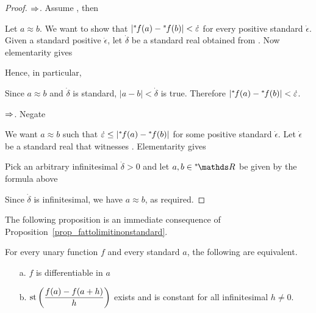 \begin{proof}
  $\Rightarrow$.
  Assume , then


  Let $a\approx b$.
  We want to show that $|{}^*\kern-.2ex f(a)-{}^*\kern-.2ex f(b)|<\dot{\varepsilon}$ for every positive standard $\dot\epsilon$.
  Given a standard positive $\dot\epsilon$, let $\dot\delta$ be a standard real obtained from .
  Now elementarity gives


  Hence, in particular,

  \ceq{\hfill\ns\RR}{\models}{\phantom{\A\,\epsilon>0\ \E\,\delta>0\ \A x, y\ \Big[}|a-b|<\dot\delta\ \ \imp\ \ |fa-fb|<\dot\epsilon.}

  Since $a\approx b$ and $\dot\delta$ is standard, $|a-b|<\dot\delta$ is true.
  Therefore $|{}^*\kern-.2ex f(a)-{}^*\kern-.2ex f(b)|<\dot{\varepsilon}$.

  $\Rightarrow$.
  Negate 


  We want  $a\approx b$ such that $\dot{\varepsilon}\le|{}^*\kern-.2ex f(a)-{}^*\kern-.2ex f(b)|$ for some positive standard $\dot\epsilon$.
  Let $\dot\epsilon$ be a standard real that witnesses .
  Elementarity gives


  Pick an arbitrary infinitesimal $\dot\delta>0$ and let $a,b\in\nsR$ be given by the formula above

  \ceq{\hfill\ns\RR}{\models}{\phantom{\E\,\epsilon>0\ \A\,\delta>0\ \E x, y\ \Big[}|a-b|<\delta\ \ \wedge\ \ \dot\epsilon\le|fa-fb|.}

  Since $\dot\delta$ is infinitesimal, we have $a\approx b$, as required.
\end{proof}

The following proposition is an immediate consequence of Proposition~\ref{prop_fattolimitinonstandard}.

\begin{proposition}
  For every unary function $f$ and every standard $a$, the following are equivalent.
  \begin{itemize}
  \item[a.] $f$ is differentiable in $a$
  \item[b.] ${\rm st}\left(\displaystyle\frac{f(a)-f(a+h)}{h}\right)$ exists and is constant for all infinitesimal $h\neq0$.
  \end{itemize}
\end{proposition}

